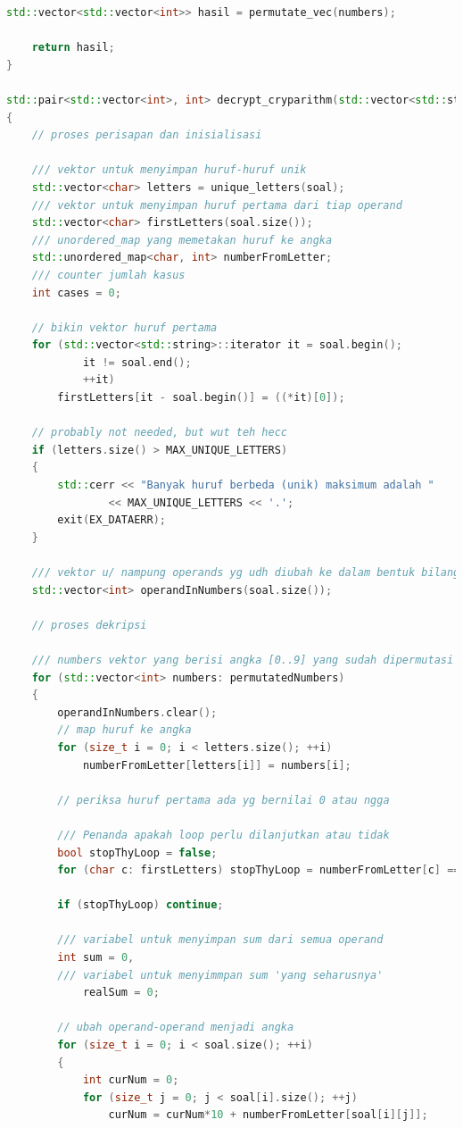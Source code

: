 \documentclass{article}
\begin{document}
\begin{lstlisting}[caption = main.cpp, language = c++]
    std::vector<std::vector<int>> hasil = permutate_vec(numbers);

    return hasil;
}

std::pair<std::vector<int>, int> decrypt_cryparithm(std::vector<std::string> soal, std::vector<std::vector<int>> permutatedNumbers)
{
    // proses perisapan dan inisialisasi

    /// vektor untuk menyimpan huruf-huruf unik
    std::vector<char> letters = unique_letters(soal);
    /// vektor untuk menyimpan huruf pertama dari tiap operand
    std::vector<char> firstLetters(soal.size());
    /// unordered_map yang memetakan huruf ke angka
    std::unordered_map<char, int> numberFromLetter;
    /// counter jumlah kasus
    int cases = 0;

    // bikin vektor huruf pertama
    for (std::vector<std::string>::iterator it = soal.begin();
            it != soal.end();
            ++it)
        firstLetters[it - soal.begin()] = ((*it)[0]);

    // probably not needed, but wut teh hecc
    if (letters.size() > MAX_UNIQUE_LETTERS)
    {
        std::cerr << "Banyak huruf berbeda (unik) maksimum adalah "
                << MAX_UNIQUE_LETTERS << '.';
        exit(EX_DATAERR);
    }

    /// vektor u/ nampung operands yg udh diubah ke dalam bentuk bilangan
    std::vector<int> operandInNumbers(soal.size());

    // proses dekripsi

    /// numbers vektor yang berisi angka [0..9] yang sudah dipermutasi
    for (std::vector<int> numbers: permutatedNumbers)
    {
        operandInNumbers.clear();
        // map huruf ke angka
        for (size_t i = 0; i < letters.size(); ++i)
            numberFromLetter[letters[i]] = numbers[i];

        // periksa huruf pertama ada yg bernilai 0 atau ngga

        /// Penanda apakah loop perlu dilanjutkan atau tidak
        bool stopThyLoop = false;
        for (char c: firstLetters) stopThyLoop = numberFromLetter[c] == 0;

        if (stopThyLoop) continue;

        /// variabel untuk menyimpan sum dari semua operand
        int sum = 0,
        /// variabel untuk menyimmpan sum 'yang seharusnya'
            realSum = 0;

        // ubah operand-operand menjadi angka
        for (size_t i = 0; i < soal.size(); ++i)
        {
            int curNum = 0;
            for (size_t j = 0; j < soal[i].size(); ++j)
                curNum = curNum*10 + numberFromLetter[soal[i][j]];


\end{lstlisting}
\end{document}
